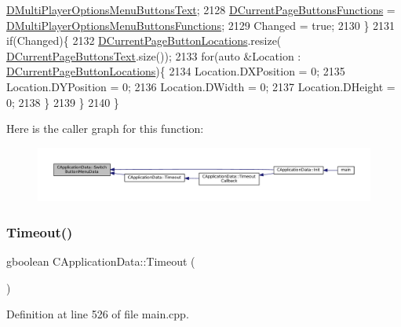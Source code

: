 \begin{DoxyCode}
      \hyperlink{classCApplicationData_a400aa1df18482fe5d9f34e861a0dc257}{DMultiPlayerOptionsMenuButtonsText};
2128         \hyperlink{classCApplicationData_ad3079e5563a19d21c1e4ceff2a188382}{DCurrentPageButtonsFunctions} = 
      \hyperlink{classCApplicationData_ad32d3cc90fd1ead1574cb6c336257e1c}{DMultiPlayerOptionsMenuButtonsFunctions};
2129         Changed = \textcolor{keyword}{true};
2130     \}
2131     \textcolor{keywordflow}{if}(Changed)\{
2132         \hyperlink{classCApplicationData_a3615df8e23cea3ce17f11cf61340a7b4}{DCurrentPageButtonLocations}.resize(
      \hyperlink{classCApplicationData_af04b7f5f8ba4e5c99c0a3530055fc15d}{DCurrentPageButtonsText}.size());
2133         \textcolor{keywordflow}{for}(\textcolor{keyword}{auto} &Location : \hyperlink{classCApplicationData_a3615df8e23cea3ce17f11cf61340a7b4}{DCurrentPageButtonLocations})\{
2134             Location.DXPosition = 0;
2135             Location.DYPosition = 0;
2136             Location.DWidth = 0;
2137             Location.DHeight = 0;
2138         \}
2139     \}
2140 \}
\end{DoxyCode}
Here is the caller graph for this function\+:\nopagebreak
\begin{figure}[H]
\begin{center}
\leavevmode
\includegraphics[width=350pt]{classCApplicationData_a2a464fd480c791ab13a1b1ca855e4578_icgraph}
\end{center}
\end{figure}
\hypertarget{classCApplicationData_aae0775b38fac01308e8a81b64db49500}{}\label{classCApplicationData_aae0775b38fac01308e8a81b64db49500} 
\subsubsection{\texorpdfstring{Timeout()}{Timeout()}}
{\footnotesize\ttfamily gboolean C\+Application\+Data\+::\+Timeout (\begin{DoxyParamCaption}{ }\end{DoxyParamCaption})\hspace{0.3cm}{\ttfamily [protected]}}



Definition at line 526 of file main.\+cpp.



